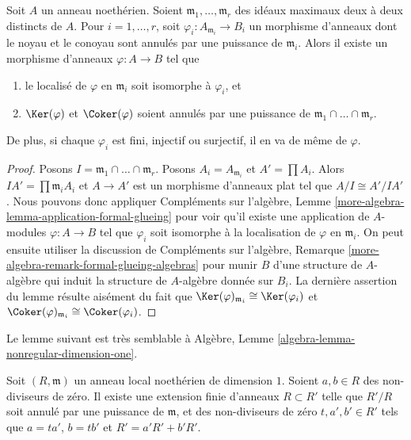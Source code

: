 \begin{lemma}
\label{lemma-glue-at-max}
Soit $A$ un anneau noethérien. Soient $\mathfrak m_1, \ldots, \mathfrak m_r$
des idéaux maximaux deux à deux distincts de $A$. Pour $i = 1, \ldots, r$, soit
$\varphi_i : A_{\mathfrak m_i} \to B_i$ un morphisme d'anneaux dont le
noyau et le conoyau sont annulés par une puissance
de $\mathfrak m_i$. Alors il existe un morphisme d'anneaux $\varphi : A \to B$ tel
que
\begin{enumerate}
\item le localisé de $\varphi$ en $\mathfrak m_i$ soit
isomorphe à $\varphi_i$, et
\item $\Ker(\varphi)$ et $\Coker(\varphi)$ soient annulés
par une puissance de $\mathfrak m_1 \cap \ldots \cap \mathfrak m_r$.
\end{enumerate}
De plus, si chaque $\varphi_i$ est fini, injectif ou
surjectif, il en va de même de $\varphi$.
\end{lemma}

\begin{proof}
Posons $I = \mathfrak m_1 \cap \ldots \cap \mathfrak m_r$. Posons
$A_i = A_{\mathfrak m_i}$ et $A' = \prod A_i$.
Alors $IA' = \prod \mathfrak m_i A_i$ et $A \to A'$
est un morphisme d'anneaux plat tel que $A/I \cong A'/IA'$.
Nous pouvons donc appliquer Compléments sur l'algèbre, Lemme
\ref{more-algebra-lemma-application-formal-glueing}
pour voir qu'il existe une application de $A$-modules $\varphi : A \to B$
tel que $\varphi_i$ soit isomorphe à la localisation de $\varphi$
en $\mathfrak m_i$. On peut ensuite utiliser la discussion de
Compléments sur l'algèbre, Remarque \ref{more-algebra-remark-formal-glueing-algebras}
pour munir $B$ d'une structure de $A$-algèbre
qui induit la structure de $A$-algèbre donnée sur $B_i$.
La dernière assertion du lemme résulte aisément du
fait que $\Ker(\varphi)_{\mathfrak m_i} \cong \Ker(\varphi_i)$
et $\Coker(\varphi)_{\mathfrak m_i} \cong \Coker(\varphi_i)$.
\end{proof}

\noindent
Le lemme suivant est très semblable à
Algèbre, Lemme \ref{algebra-lemma-nonregular-dimension-one}.

\begin{lemma}
\label{lemma-Noetherian-domain-dim-1-two-elements}
Soit $(R, \mathfrak m)$ un anneau local noethérien de dimension $1$.
Soient $a, b \in R$ des non-diviseurs de zéro.
Il existe une extension finie d'anneaux $R \subset R'$
telle que $R'/R$ soit annulé par une puissance de $\mathfrak m$,
et des non-diviseurs de zéro $t, a', b' \in R'$ tels que
$a = ta'$, $b = tb'$ et $R' = a'R' + b'R'$.
\end{lemma}

